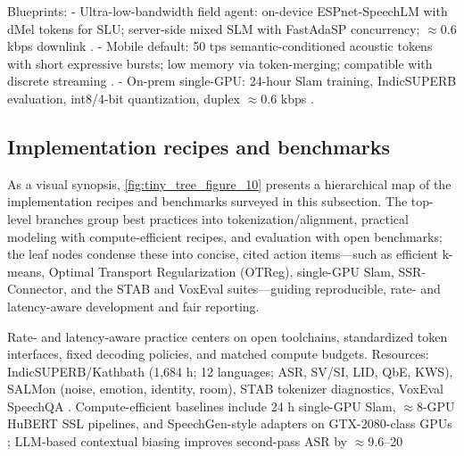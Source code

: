 \documentclass{article}
\begin{document}
Blueprints:
- Ultra-low-bandwidth field agent: on-device ESPnet-SpeechLM with dMel tokens for SLU; server-side mixed SLM with FastAdaSP concurrency; $\approx$0.6 kbps downlink \cite{bai2025dmelspeechtokenizationmadesimple,tian2025espnetspeechlmopenspeechlanguagemodeltoo,entry2025indicsuperbspeechprocessinguniversalperf,lu2024fastadaspmultitaskadaptedefficientinfere}.
- Mobile default: 50 tps semantic-conditioned acoustic tokens with short expressive bursts; low memory via token-merging; compatible with discrete streaming \cite{mousavi2024dasbdiscreteaudiospeechbenchmark,yang2025diffsoundstreamefficientspeechtokenizati,lu2024fastadaspmultitaskadaptedefficientinfere,zhao2024textlessstreamingspeechtranslationsemant}.
- On-prem single-GPU: 24-hour Slam training, IndicSUPERB evaluation, int8/4-bit quantization, duplex $\approx$0.6 kbps \cite{maimon2025slammingtrainingspeechlanguagemodelonegp,entry2025indicsuperbspeechprocessinguniversalperf,dao2025ichigomixedmodalearlyfusionrealtimevoice}.

\subsection{Implementation recipes and benchmarks} \label{subsec:Implementation recipes and benchmarks}
As a visual synopsis, \autoref{fig:tiny_tree_figure_10} presents a hierarchical map of the implementation recipes and benchmarks surveyed in this subsection. The top-level branches group best practices into tokenization/alignment, practical modeling with compute-efficient recipes, and evaluation with open benchmarks; the leaf nodes condense these into concise, cited action items---such as efficient k-means, Optimal Transport Regularization (OTReg), single-GPU Slam, SSR-Connector, and the STAB and VoxEval suites---guiding reproducible, rate- and latency-aware development and fair reporting.

Rate- and latency-aware practice centers on open toolchains, standardized token interfaces, fixed decoding policies, and matched compute budgets. Resources: IndicSUPERB/Kathbath (1,684 h; 12 languages; ASR, SV/SI, LID, QbE, KWS), SALMon (noise, emotion, identity, room), STAB tokenizer diagnostics, VoxEval SpeechQA \cite{entry2025indicsuperbspeechprocessinguniversalperf,maimon2025salmonsuiteacousticlanguagemodelevaluati,vashishth2024stabspeechtokenizerassessmentbenchmark,cui2025voxevalbenchmarkingknowledgeunderstandin}. Compute-efficient baselines include 24 h single-GPU Slam, $\approx$8-GPU HuBERT SSL pipelines, and SpeechGen-style adapters on GTX-2080-class GPUs \cite{maimon2025slammingtrainingspeechlanguagemodelonegp,chen2023reducingbarriersselfsupervisedlearninghu,wu2023speechgenunlockinggenerativepowerspeechl}; LLM-based contextual biasing improves second-pass ASR by $\approx$9.6--20%
\end{document}
